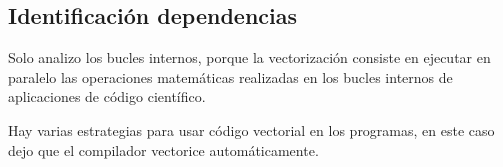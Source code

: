 \subsection{Identificación dependencias}
\par Solo analizo los bucles internos, porque la vectorización consiste en ejecutar en paralelo las operaciones matemáticas realizadas en 
los bucles internos de aplicaciones de código científico.
\par Hay varias estrategias para usar código vectorial en los programas, en este caso dejo que el compilador 
vectorice automáticamente.





